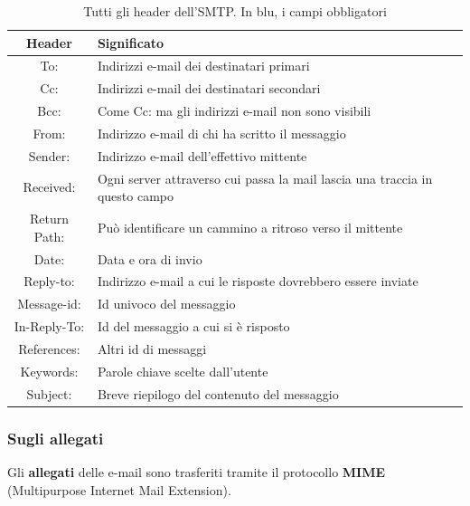 \begin{table}[htp]
    \centering
    \begin{tabular}{|c|p{9cm}|}
        \hline
        \textbf{Header} & \textbf{Significato}\\
        \hline
        \cellcolor{blue!25}To: & Indirizzi e-mail dei destinatari primari\\
        \hline
        Cc: & Indirizzi e-mail dei destinatari secondari\\
        \hline
        Bcc: & Come Cc: ma gli indirizzi e-mail non sono visibili\\
        \hline
        \cellcolor{blue!25}From: & Indirizzo e-mail di chi ha scritto il messaggio\\
        \hline
        Sender: & Indirizzo e-mail dell'effettivo mittente\\
        \hline
        Received: & Ogni server attraverso cui passa la mail lascia
        una traccia in questo campo\\
        \hline
        Return Path: & Può identificare un cammino a ritroso verso il mittente\\
        \hline
        Date: & Data e ora di invio\\
        \hline
        Reply-to: & Indirizzo e-mail a cui le risposte dovrebbero essere inviate\\
        \hline
        Message-id: & Id univoco del messaggio\\
        \hline
        In-Reply-To:& Id del messaggio a cui si è risposto\\
        \hline
        References: & Altri id di messaggi\\
        \hline
        Keywords: & Parole chiave scelte dall'utente\\
        \hline
        \cellcolor{blue!25} Subject: & Breve riepilogo del contenuto del messaggio\\
        \hline
    \end{tabular}
    \caption{Tutti gli header dell'SMTP. In blu, i campi obbligatori}
\end{table}

\subsubsection{Sugli allegati}
Gli \textbf{allegati} delle e-mail sono trasferiti tramite il protocollo \textbf{MIME} (Multipurpose Internet Mail Extension).

\newpage

